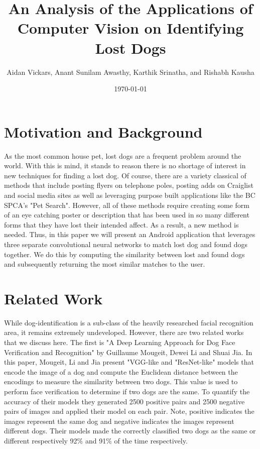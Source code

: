 \documentclass{article}
\title{An Analysis of the Applications of Computer Vision on Identifying Lost Dogs}
\author{Aidan Vickars, Anant Sunilam Awasthy, Karthik Srinatha, and Rishabh Kausha}
\date{\today}
\begin{document}
\maketitle

\newpage

\tableofcontents

\newpage
\section{Motivation and Background}
As the most common house pet, lost dogs are a frequent problem around the world.  With this is mind, it stands to reason there is no shortage of interest in new techniques for finding a lost dog.  Of course, there are a variety classical of methods that include posting flyers on telephone poles, posting adds on Craiglist and social media sites as well as leveraging purpose built applications like the BC SPCA's "Pet Search".  However, all of these methods require creating some form of an eye catching poster or description that has been used in so many different forms that they have lost their intended affect.  As a result, a new method is needed.  Thus, in this paper we will present an Android application that leverages three separate convolutional neural networks to match lost dog and found dogs together.  We do this by computing the similarity between lost and found dogs and subsequently returning the most similar matches to the user.

\section{Related Work}
	While dog-identification is a sub-class of the heavily researched facial recognition area, it remains extremely undeveloped.  However, there are two related works that we discuss here.  The first is "A Deep Learning Approach for Dog Face Verification and Recognition" \cite{MougeotGuillaume2019ADLA}  by  Guillaume Mougeit, Dewei Li and Shuai Jia.  In this paper, Mougeit, Li and Jia present "VGG-like and "ResNet-like" models that encode the image of a dog and compute the Euclidean distance between the encodings to measure the similarity between two dogs.  This value is used to perform face verification to determine if two dogs are the same.  To quantify the accuracy of their models they generated 2500 positive pairs and 2500 negative pairs of images and applied their model on each pair.  Note, positive indicates the images represent the same dog and negative indicates the images represent different dogs.  Their models made the correctly classified two dogs as the same or different respectively 92\% and 91\% of the time respectively.
\end{document}
